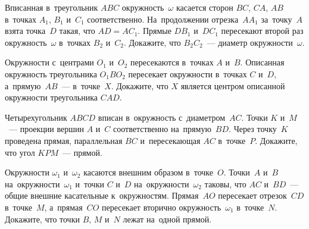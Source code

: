 \begin{problems}
\item
Вписанная в~треугольник $ABC$ окружность~$\omega$ касается
сторон $BC$, $CA$, $AB$ в~точках $A_1$, $B_1$ и~$C_1$ соответственно.
На~продолжении отрезка~$A A_1$ за~точку~$A$ взята точка~$D$ такая, что
$AD = A C_1$.
Прямые $D B_1$ и~$D C_1$ пересекают второй раз окружность~$\omega$
в~точках $B_2$ и~$C_2$.
Докажите, что $B_2 C_2$~--- диаметр окружности~$\omega$.

\item
Окружности с~центрами $O_1$ и~$O_2$ пересекаются в~точках $A$ и~$B$.
Описанная окружность треугольника $O_1 B O_2$ пересекает окружности
в~точках $C$ и~$D$, а~прямую~$AB$~--- в~точке~$X$.
Докажите, что $X$ является центром описанной окружности треугольника $CAD$.



\item
Четырехугольник $ABCD$ вписан в~окружность с~диаметром~$AC$.
Точки $K$ и~$M$~--- проекции вершин $A$ и~$C$ соответственно на~прямую~$BD$.
Через точку~$K$ проведена прямая, параллельная $BC$ и~пересекающая $AC$
в~точке~$P$.
Докажите, что угол $KPM$~--- прямой.

\item
Окружности $\omega_1$ и~$\omega_2$ касаются внешним образом в~точке~$O$.
Точки~$A$ и~$B$ на~окружности~$\omega_1$ и~точки $C$ и~$D$
на~окружности~$\omega_2$ таковы,
что $AC$ и~$BD$~--- общие внешние касательные к~окружностям.
Прямая~$AO$ пересекает отрезок~$CD$ в~точке~$M$, а~прямая~$CO$ пересекает
вторично окружность~$\omega_1$ в~точке~$N$.
Докажите, что точки $B$, $M$ и~$N$ лежат на~одной прямой.

\end{problems}

